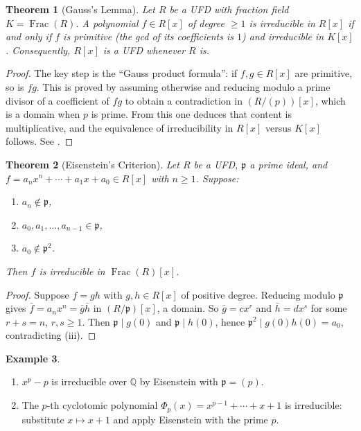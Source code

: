 \documentclass[12pt,a4paper]{amsart}
\newtheorem{theorem}{Theorem}[section]
\theoremstyle{definition}
\newtheorem{example}[theorem]{Example}
\theoremstyle{definition}
\DeclareMathOperator{\Frac}{Frac}
\begin{document}
\begin{theorem}[Gauss's Lemma]
Let $R$ be a UFD with fraction field $K = \Frac(R)$.
A polynomial $f \in R[x]$ of degree $\geq 1$ is irreducible in $R[x]$ if and only if
$f$ is \emph{primitive} (the gcd of its coefficients is $1$) and irreducible in $K[x]$.
Consequently, $R[x]$ is a UFD whenever $R$ is.
\end{theorem}

\begin{proof}
The key step is the ``Gauss product formula'': if $f, g \in R[x]$ are primitive,
so is $fg$. This is proved by assuming otherwise and reducing modulo a prime divisor
of a coefficient of $fg$ to obtain a contradiction in $(R/(p))[x]$, which is a domain
when $p$ is prime. From this one deduces that content is multiplicative, and the
equivalence of irreducibility in $R[x]$ versus $K[x]$ follows.
See \cite[IV, \S2]{Lang2002}.
\end{proof}

\begin{theorem}[Eisenstein's Criterion]\label{thm:eisenstein}
Let $R$ be a UFD, $\mathfrak{p}$ a prime ideal, and
$f = a_n x^n + \cdots + a_1 x + a_0 \in R[x]$ with $n \geq 1$.
Suppose:
\begin{enumerate}[label=(\roman*)]
  \item $a_n \notin \mathfrak{p}$,
  \item $a_0, a_1, \ldots, a_{n-1} \in \mathfrak{p}$,
  \item $a_0 \notin \mathfrak{p}^2$.
\end{enumerate}
Then $f$ is irreducible in $\Frac(R)[x]$.
\end{theorem}

\begin{proof}
Suppose $f = gh$ with $g, h \in R[x]$ of positive degree. Reducing modulo $\mathfrak{p}$
gives $\bar{f} = a_n x^n = \bar{g}\bar{h}$ in $(R/\mathfrak{p})[x]$, a domain.
So $\bar{g} = cx^r$ and $\bar{h} = dx^s$ for some $r + s = n$, $r, s \geq 1$.
Then $\mathfrak{p} \mid g(0)$ and $\mathfrak{p} \mid h(0)$, hence
$\mathfrak{p}^2 \mid g(0)h(0) = a_0$, contradicting (iii).
\end{proof}

\begin{example}
\begin{enumerate}[label=(\alph*)]
  \item $x^p - p$ is irreducible over $\mathbb{Q}$ by Eisenstein with $\mathfrak{p}=(p)$.
  \item The $p$-th cyclotomic polynomial $\Phi_p(x) = x^{p-1} + \cdots + x + 1$ is
        irreducible: substitute $x \mapsto x+1$ and apply Eisenstein with the prime $p$.
\end{enumerate}
\end{example}
\end{document}
